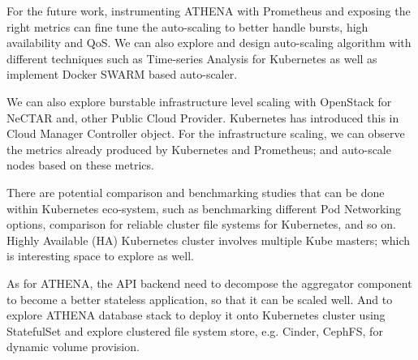 For the future work, instrumenting ATHENA with Prometheus and exposing the right metrics can fine tune the auto-scaling to better handle bursts, high availability and QoS. We can also explore and design auto-scaling algorithm with different techniques such as Time-series Analysis for Kubernetes as well as implement Docker SWARM based auto-scaler.

We can also explore burstable infrastructure level scaling with OpenStack for NeCTAR and, other Public Cloud Provider. Kubernetes has introduced this in Cloud Manager Controller object. For the infrastructure scaling, we can observe the metrics already produced by Kubernetes and Prometheus; and auto-scale nodes based on these metrics.

There are potential comparison and benchmarking studies that can be done within Kubernetes eco-system, such as benchmarking different Pod Networking options, comparison for reliable cluster file systems for Kubernetes, and so on. Highly Available (HA) Kubernetes cluster involves multiple Kube masters; which is interesting space to explore as well.

As for ATHENA, the API backend need to decompose the aggregator component to become a better stateless application, so that it can be scaled well. And to explore ATHENA database stack to deploy it onto Kubernetes cluster using StatefulSet and explore clustered file system store, e.g. Cinder, CephFS, for dynamic volume provision.